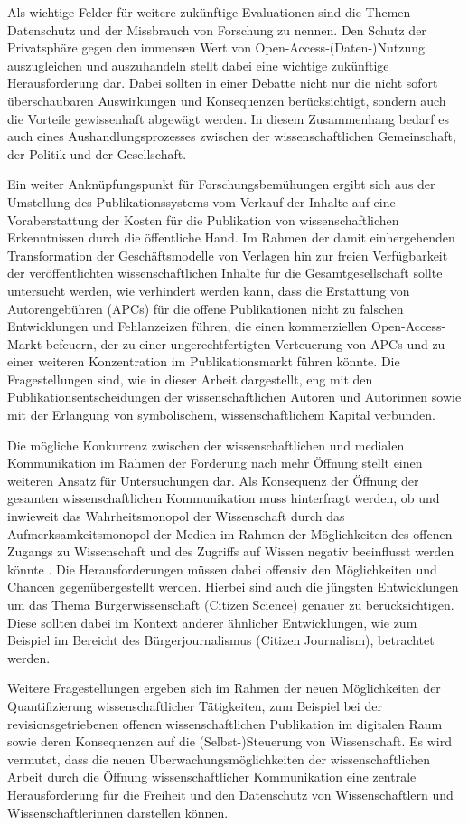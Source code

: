 Als wichtige Felder für weitere zukünftige Evaluationen sind die Themen Datenschutz und der Missbrauch von Forschung \cite{Fritsch_2015} zu nennen. Den Schutz der Privatsphäre gegen den immensen Wert von Open-Access-(Daten-)Nutzung auszugleichen und auszuhandeln stellt dabei eine wichtige zukünftige Herausforderung dar. Dabei sollten in einer Debatte nicht nur die nicht sofort überschaubaren Auswirkungen und Konsequenzen berücksichtigt, sondern auch die Vorteile gewissenhaft abgewägt werden. In diesem Zusammenhang bedarf es auch eines Aushandlungsprozesses zwischen der wissenschaftlichen Gemeinschaft, der Politik und der Gesellschaft.

Ein weiter Anknüpfungspunkt für Forschungsbemühungen ergibt sich aus der Umstellung des Publikationssystems vom Verkauf der Inhalte auf eine Voraberstattung der Kosten für die Publikation von wissenschaftlichen Erkenntnissen durch die öffentliche Hand. Im Rahmen der damit einhergehenden Transformation der Geschäftsmodelle von Verlagen hin zur freien Verfügbarkeit der veröffentlichten wissenschaftlichen Inhalte für die Gesamtgesellschaft sollte untersucht werden, wie verhindert werden kann, dass die Erstattung von Autorengebühren (APCs) für die offene Publikationen nicht zu falschen Entwicklungen und Fehlanzeizen führen, die einen kommerziellen Open-Access-Markt befeuern, der zu einer ungerechtfertigten Verteuerung von APCs und zu einer weiteren Konzentration im Publikationsmarkt führen könnte. Die Fragestellungen sind, wie in dieser Arbeit dargestellt, eng mit den Publikationsentscheidungen der wissenschaftlichen Autoren und Autorinnen sowie mit der Erlangung von symbolischem, wissenschaftlichem Kapital verbunden.

Die mögliche Konkurrenz zwischen der wissenschaftlichen und medialen Kommunikation im Rahmen der Forderung nach mehr Öffnung stellt einen weiteren Ansatz für Untersuchungen dar. Als Konsequenz der Öffnung der gesamten wissenschaftlichen Kommunikation muss hinterfragt werden, ob und inwieweit das Wahrheitsmonopol der Wissenschaft durch das Aufmerksamkeitsmonopol der Medien im Rahmen der Möglichkeiten des offenen Zugangs zu Wissenschaft und des Zugriffs auf Wissen negativ beeinflusst werden könnte \cite{Weingart_2005}. Die Herausforderungen müssen dabei offensiv den Möglichkeiten und Chancen gegenübergestellt werden. Hierbei sind auch die jüngsten Entwicklungen um das Thema Bürgerwissenschaft (Citizen Science) genauer zu berücksichtigen. Diese sollten dabei im Kontext anderer ähnlicher Entwicklungen, wie zum Beispiel im Bereicht des Bürgerjournalismus (Citizen Journalism), betrachtet werden.

Weitere Fragestellungen ergeben sich im Rahmen der neuen Möglichkeiten der Quantifizierung wissenschaftlicher Tätigkeiten, zum Beispiel bei der revisionsgetriebenen offenen wissenschaftlichen Publikation im digitalen Raum sowie deren Konsequenzen auf die (Selbst-)Steuerung von Wissenschaft. Es wird vermutet, dass die neuen Überwachungsmöglichkeiten der wissenschaftlichen Arbeit durch die Öffnung wissenschaftlicher Kommunikation eine zentrale Herausforderung für die Freiheit und den Datenschutz von Wissenschaftlern und Wissenschaftlerinnen darstellen können.
